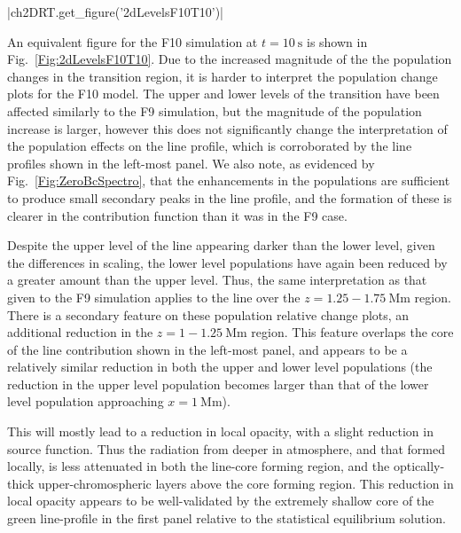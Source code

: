 \py[2DRT]|ch2DRT.get_figure('2dLevelsF10T10')|

An equivalent figure for the F10 simulation at $t=\SI{10}{\second}$ is shown in Fig.~\ref{Fig:2dLevelsF10T10}.
Due to the increased magnitude of the the population changes in the transition region, it is harder to interpret the population change plots for the F10 model.
The upper and lower levels of the \Ha{} transition have been affected similarly to the F9 simulation, but the magnitude of the population increase is larger, however this does not significantly change the interpretation of the population effects on the line profile, which is corroborated by the line profiles shown in the left-most panel.
We also note, as evidenced by Fig.~\ref{Fig:ZeroBcSpectro}, that the enhancements in the \Ha{} populations are sufficient to produce small secondary peaks in the line profile, and the formation of these is clearer in the contribution function than it was in the F9 case.

Despite the upper level of the \CaLine{} line appearing darker than the lower level, given the differences in scaling, the lower level populations have again been reduced by a greater amount than the upper level.
Thus, the same interpretation as that given to the F9 simulation applies to the \CaLine{} line over the $z=1.25-\SI{1.75}{\mega\metre}$ region.
There is a secondary feature on these \Caii{} population relative change plots, an additional reduction in the $z=1-\SI{1.25}{\mega\metre}$ region.
This feature overlaps the core of the line contribution shown in the left-most panel, and appears to be a relatively similar reduction in both the upper and lower level populations (the reduction in the upper level population becomes larger than that of the lower level population approaching $x=\SI{1}{\mega\metre}$).

This will mostly lead to a reduction in local opacity, with a slight reduction in source function.
Thus the radiation from deeper in atmosphere, and that formed locally, is less attenuated in both the line-core forming region, and the optically-thick upper-chromospheric layers above the core forming region.
This reduction in local opacity appears to be well-validated by the extremely shallow core of the green line-profile in the first panel relative to the statistical equilibrium solution.


